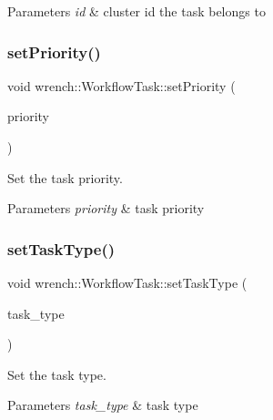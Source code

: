 \begin{DoxyParams}{Parameters}
{\em id} & cluster id the task belongs to \\
\hline
\end{DoxyParams}
\mbox{\label{classwrench_1_1_workflow_task_ae5101ae5e4e386705a549e4e91432049}} 
\subsubsection{\texorpdfstring{set\+Priority()}{setPriority()}}
{\footnotesize\ttfamily void wrench\+::\+Workflow\+Task\+::set\+Priority (\begin{DoxyParamCaption}\item[{long}]{priority }\end{DoxyParamCaption})}



Set the task priority. 


\begin{DoxyParams}{Parameters}
{\em priority} & task priority \\
\hline
\end{DoxyParams}
\mbox{\label{classwrench_1_1_workflow_task_ab10c4b26c9f669dd39c9bf76b597abf9}} 
\subsubsection{\texorpdfstring{set\+Task\+Type()}{setTaskType()}}
{\footnotesize\ttfamily void wrench\+::\+Workflow\+Task\+::set\+Task\+Type (\begin{DoxyParamCaption}\item[{\hyperlink{classwrench_1_1_workflow_task_a490a935259b9425a3e4fb011a86cb4bf}{Task\+Type}}]{task\+\_\+type }\end{DoxyParamCaption})}



Set the task type. 


\begin{DoxyParams}{Parameters}
{\em task\+\_\+type} & task type \\
\hline
\end{DoxyParams}
\mbox{\label{classwrench_1_1_workflow_task_a542a6f96bea2d2e67d21bc32c0151e73}} 
